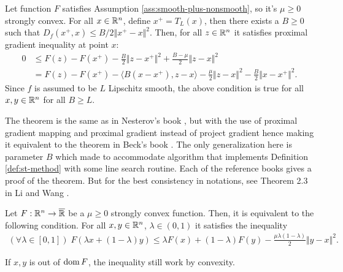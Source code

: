 \documentclass[12pt]{article}
\begin{document}
        \begin{theorem}\label{thm:pg-ineq}
            Let function $F$ satisfies Assumption \ref{ass:smooth-plus-nonsmooth}, so it's $\mu \ge 0$ strongly convex. 
            For all $x\in \mathbb R^n$, define $x^+ = T_L(x)$, then there exists a $B \ge 0$ such that $D_f(x^+, x) \le B/2 \Vert x^+ - x\Vert^2$. 
            Then, for all $z \in \mathbb R^n$ it satisfies proximal gradient inequality at point $x$:  
            \begin{align*}
                0&\le F(z) - F(x^+) - \frac{B}{2}\Vert z - x^+\Vert^2  + \frac{B - \mu}{2}\Vert z - x\Vert^2
                \\
                &=  F(z) - F(x^+) - \langle B(x - x^+), z - x\rangle
                - \frac{\mu}{2}\Vert z - x\Vert^2
                - \frac{B}{2}\Vert x - x^+\Vert^2. 
            \end{align*}
            Since $f$ is assumed to be $L$ Lipschitz smooth, the above condition is true for all $x, y \in \mathbb R^n$ for all $B \ge L$. 
        \end{theorem}
        \begin{remark}
            The theorem is the same as in Nesterov's book \cite[Theorem 2.2.13]{nesterov_lectures_2018}, but with the use of proximal gradient mapping and proximal gradient instead of project gradient hence making it equivalent to the theorem in Beck's book \cite[Theorem 10.16]{beck_first-order_2017}. 
            The only generalization here is parameter $B$ which made to accommodate algorithm that implements Definition \ref{def:st-method} with some line search routine. 
            Each of the reference books gives a proof of the theorem. 
            But for the best consistency in notations, see Theorem 2.3 in Li and Wang \cite{li_relaxed_2025}. 
        \end{remark}
        \begin{theorem}\label{thm:jesen}
            Let $F: \mathbb R^n \rightarrow \overline {\mathbb R}$ be a $\mu \ge 0$ strongly convex function. 
            Then, it is equivalent to the following condition. 
            For all $x, y \in \mathbb R^n$, $\lambda \in (0, 1)$ it satisfies the inequality 
            \begin{align*}
                (\forall \lambda \in [0, 1])\; 
                F(\lambda x + (1 - \lambda)y) \le \lambda F(x) + (1 - \lambda)F(y) -\frac{\mu\lambda(1 - \lambda)}{2} \Vert y - x\Vert^2. 
            \end{align*}
        \end{theorem}
        \begin{remark}
            If $x, y$ is out of $\operatorname{dom} F$, the inequality still work by convexity. 
        \end{remark}
    
\end{document}
